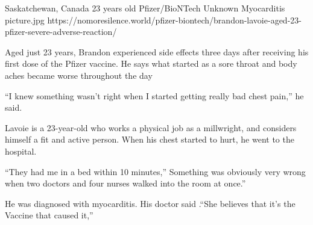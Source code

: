 {Saskatchewan, Canada}
{23 years old}
{Pfizer/BioNTech}
{Unknown}
{Myocarditis}
{picture.jpg}
{https://nomoresilence.world/pfizer-biontech/brandon-lavoie-aged-23-pfizer-severe-adverse-reaction/}
{

Aged just 23 years, Brandon experienced side effects three days after receiving
his first dose of the Pfizer vaccine. He says what started as a sore throat and
body aches became worse throughout the day

“I knew something wasn’t right when I started getting really bad chest pain,” he
said.

Lavoie is a 23-year-old who works a physical job as a millwright, and considers
himself a fit and active person. When his chest started to hurt, he went to the
hospital.

“They had me in a bed within 10 minutes,” Something was obviously very wrong
when two doctors and four nurses walked into the room at once.”

He was diagnosed with myocarditis. His doctor said .“She believes that it’s the
Vaccine that caused it,”

}
